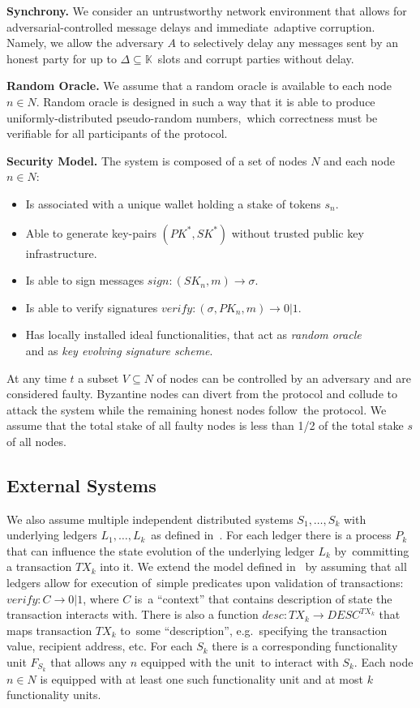\textbf{Synchrony.}
We consider an untrustworthy network environment that allows for adversarial-controlled message delays and immediate\
adaptive corruption.
Namely, we allow the adversary $A$ to selectively delay any messages sent by an honest party for up to $\Delta \subseteq \mathbb{K}$\
slots and corrupt parties without delay.

\textbf{Random Oracle.}
We assume that a random oracle is available to each node $n \in N$.
Random oracle is designed in such a way that it is able to produce uniformly-distributed pseudo-random numbers,\
which correctness must be verifiable for all participants of the protocol.

\textbf{Security Model.}\label{subsec:security-model.}
The system is composed of a set of nodes $N$ and each node $n \in N$:
\begin{itemize}
    \item Is associated with a unique wallet holding a stake of tokens $s_n$.
    \item Able to generate key-pairs ${(PK^*, SK^*)}$ without trusted public key infrastructure.
    \item Is able to sign messages ${sign: (SK_n, m) \rightarrow \sigma}$.
    \item Is able to verify signatures ${verify: (\sigma, PK_n, m) \rightarrow 0 | 1}$.
    \item Has locally installed ideal functionalities, that act as \emph{random oracle}\\
    and as \textit{key evolving signature scheme}.
\end{itemize}

At any time $t$ a subset ${V \subseteq N}$ of nodes can be controlled by an adversary and are considered faulty.
Byzantine nodes can divert from the protocol and collude to attack the system while the remaining honest nodes follow\
the protocol.
We assume that the total stake of all faulty nodes is less than 1/2 of the total stake $s$ of all nodes.

\subsection{External Systems}\label{subsec:external-systems.}
We also assume multiple independent distributed systems ${S_1, \dots, S_k}$ with underlying ledgers ${L_1, \dots, L_k}$\
as defined in~\cite{cryptoeprint:2019/1128}.
For each ledger there is a process $P_k$ that can influence the state evolution of the underlying ledger $L_k$ by\
committing a transaction $TX_k$ into it.
We extend the model defined in~\cite{cryptoeprint:2019/1128} by assuming that all ledgers allow for execution of\
simple predicates upon validation of transactions: ${verify: C \rightarrow 0 | 1}$, where $C$ is\
a \enquote{context} that contains description of state the transaction interacts with.
There is also a function ${desc: TX_k \rightarrow DESC^{TX_k}}$ that maps transaction $TX_k$ to\
some \enquote{description}, e.g.\ specifying the transaction value, recipient address, etc.
For each  $S_k$ there is a corresponding functionality unit $F_{S_k}$ that allows any $n$ equipped with the unit\
to interact with $S_k$.
Each node $n \in N$ is equipped with at least one such functionality unit and at most $k$ functionality units.
